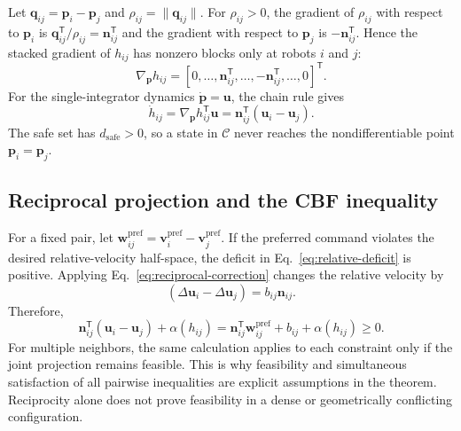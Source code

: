 \documentclass[pdflatex,sn-mathphys-num]{sn-jnl}
\begin{document}
Let $\mathbf{q}_{ij}=\mathbf{p}_i-\mathbf{p}_j$ and $\rho_{ij}=\lVert\mathbf{q}_{ij}\rVert$. For $\rho_{ij}>0$, the gradient of $\rho_{ij}$ with respect to $\mathbf{p}_i$ is $\mathbf{q}_{ij}^{\mathsf T}/\rho_{ij}=\mathbf{n}_{ij}^{\mathsf T}$ and the gradient with respect to $\mathbf{p}_j$ is $-\mathbf{n}_{ij}^{\mathsf T}$. Hence the stacked gradient of $h_{ij}$ has nonzero blocks only at robots $i$ and $j$:
\begin{equation}
\nabla_{\mathbf{p}} h_{ij}=\left[0,\ldots,\mathbf{n}_{ij}^{\mathsf T},\ldots,-\mathbf{n}_{ij}^{\mathsf T},\ldots,0\right]^{\mathsf T}.
\label{eq:appendix-gradient}
\end{equation}
For the single-integrator dynamics $\dot{\mathbf{p}}=\mathbf{u}$, the chain rule gives
\begin{equation}
\dot h_{ij}=\nabla_{\mathbf{p}} h_{ij}^{\mathsf T}\mathbf{u}=\mathbf{n}_{ij}^{\mathsf T}(\mathbf{u}_i-\mathbf{u}_j).
\label{eq:appendix-lie}
\end{equation}
The safe set has $d_{\mathrm{safe}}>0$, so a state in $\mathcal{C}$ never reaches the nondifferentiable point $\mathbf{p}_i=\mathbf{p}_j$.

\subsection{Reciprocal projection and the CBF inequality}

For a fixed pair, let $\mathbf{w}_{ij}^{\mathrm{pref}}=\mathbf{v}_i^{\mathrm{pref}}-\mathbf{v}_j^{\mathrm{pref}}$. If the preferred command violates the desired relative-velocity half-space, the deficit in Eq.~\ref{eq:relative-deficit} is positive. Applying Eq.~\ref{eq:reciprocal-correction} changes the relative velocity by
\begin{equation}
(\Delta\mathbf{u}_i-\Delta\mathbf{u}_j)=b_{ij}\mathbf{n}_{ij}.
\label{eq:appendix-relative-correction}
\end{equation}
Therefore,
\begin{equation}
\mathbf{n}_{ij}^{\mathsf T}(\mathbf{u}_i-\mathbf{u}_j)+\alpha(h_{ij})=\mathbf{n}_{ij}^{\mathsf T}\mathbf{w}_{ij}^{\mathrm{pref}}+b_{ij}+\alpha(h_{ij})\geq 0.
\label{eq:appendix-cbf-satisfied}
\end{equation}
For multiple neighbors, the same calculation applies to each constraint only if the joint projection remains feasible. This is why feasibility and simultaneous satisfaction of all pairwise inequalities are explicit assumptions in the theorem. Reciprocity alone does not prove feasibility in a dense or geometrically conflicting configuration.
\end{document}
